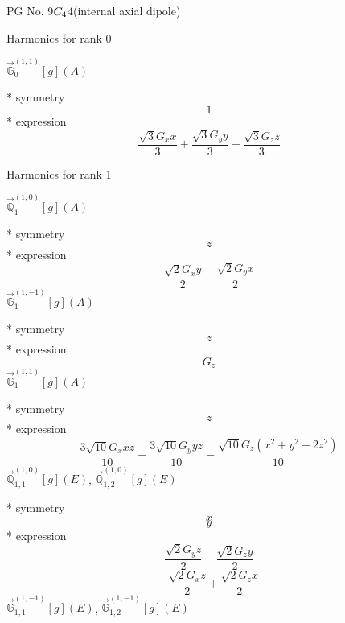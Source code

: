 \documentclass[fleqn,8pt]{jsarticle}
\begin{document}
\setcounter{MaxMatrixCols}{32}

\renewcommand{\tablename}{Table~}
\renewcommand{\figurename}{Figure~}
\begin{center}
\LARGE
PG No. 9\quad$C_{\rm 4}$\quad$4$\quad[ tetragonal ] (internal axial dipole)
\end{center}

\noindent * Harmonics for rank 0

\noindent\quad $\vec{\mathbb{G}}_{0}^{(1,1)}[g](A)$

\noindent\quad ** symmetry
\begin{dmath*}
1
\end{dmath*}
\noindent\quad ** expression
\begin{dmath*}
\frac{\sqrt{3} G_{x} x}{3} + \frac{\sqrt{3} G_{y} y}{3} + \frac{\sqrt{3} G_{z} z}{3}
\end{dmath*}

\noindent * Harmonics for rank 1

\noindent\quad $\vec{\mathbb{Q}}_{1}^{(1,0)}[g](A)$

\noindent\quad ** symmetry
\begin{dmath*}
z
\end{dmath*}
\noindent\quad ** expression
\begin{dmath*}
\frac{\sqrt{2} G_{x} y}{2} - \frac{\sqrt{2} G_{y} x}{2}
\end{dmath*}
\noindent\quad $\vec{\mathbb{G}}_{1}^{(1,-1)}[g](A)$

\noindent\quad ** symmetry
\begin{dmath*}
z
\end{dmath*}
\noindent\quad ** expression
\begin{dmath*}
G_{z}
\end{dmath*}
\noindent\quad $\vec{\mathbb{G}}_{1}^{(1,1)}[g](A)$

\noindent\quad ** symmetry
\begin{dmath*}
z
\end{dmath*}
\noindent\quad ** expression
\begin{dmath*}
\frac{3 \sqrt{10} G_{x} x z}{10} + \frac{3 \sqrt{10} G_{y} y z}{10} - \frac{\sqrt{10} G_{z} \left(x^{2} + y^{2} - 2 z^{2}\right)}{10}
\end{dmath*}
\noindent\quad $\vec{\mathbb{Q}}_{1,1}^{(1,0)}[g](E)$, $\vec{\mathbb{Q}}_{1,2}^{(1,0)}[g](E)$

\noindent\quad ** symmetry
\begin{dmath*}
x
\end{dmath*}
\begin{dmath*}
y
\end{dmath*}
\noindent\quad ** expression
\begin{dmath*}
\frac{\sqrt{2} G_{y} z}{2} - \frac{\sqrt{2} G_{z} y}{2}
\end{dmath*}
\begin{dmath*}
- \frac{\sqrt{2} G_{x} z}{2} + \frac{\sqrt{2} G_{z} x}{2}
\end{dmath*}
\noindent\quad $\vec{\mathbb{G}}_{1,1}^{(1,-1)}[g](E)$, $\vec{\mathbb{G}}_{1,2}^{(1,-1)}[g](E)$
\end{document}

